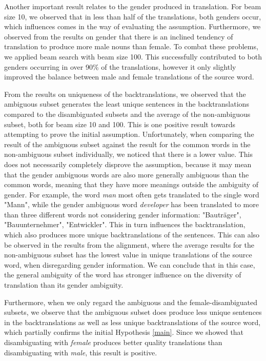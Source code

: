 Another important result relates to the gender produced in translation. For beam size 10, we observed that in less than half of the translations, both genders occur, which influences comes in the way of evaluating the assumption. Furthermore, we observed from the results on gender that there is an inclined tendency of translation to produce more male nouns than female. To combat these problems, we applied beam search with beam size 100. This successfully contributed to both genders occurring in over 90\% of the translations, however it only slightly improved the balance between male and female translations of the source word.

From the results on uniqueness of the backtranslations, we observed that the ambiguous subset generates the least unique sentences in the backtranslations compared to the disambiguated subsets and the average of the non-ambiguous subset, both for beam size 10 and 100. This is one positive result towards attempting to prove the initial assumption. Unfortunately, when comparing the result of the ambiguous subset against the result for the common words in the non-ambiguous subset individually, we noticed that there is a lower value. This does not necessarily completely disprove the assumption, because it may mean that the gender ambiguous words are also more generally ambiguous than the common words, meaning that they have more meanings outside the ambiguity of gender. For example, the word \textit{man} most often gets translated to the single word "Mann", while the gender ambiguous word \textit{developer} has been translated to more than three different words not considering gender information: "Bauträger", "Bauunternehmer", "Entwickler". This in turn influences the backtranslation, which also produces more unique backtranslations of the sentences. This can also be observed in the results from the alignment, where the average results for the non-ambiguous subset has the lowest value in unique translations of the source word, when disregarding gender information.  We can conclude that in this case, the general ambiguity of the word has stronger influence on the diversity of translation than its gender ambiguity.

Furthermore, when we only regard the ambiguous and the female-disambiguated subsets, we observe that the ambiguous subset does produce less unique sentences in the backtranslations as well as less unique backtranslations of the source word, which partially confirms the initial Hypothesis \ref{main}. Since we showed that disambiguating with \textit{female} produces better quality translations than disambiguating with \textit{male}, this result is positive.

